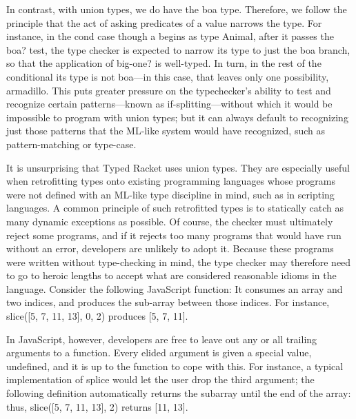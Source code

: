 In contrast, with union types, we do have the boa type. Therefore, we follow the
principle that the act of asking predicates of a value narrows the type. For
instance, in the cond case
though a begins as type Animal, after it passes the boa? test, the type checker
is expected to narrow its type to just the boa branch, so that the application
of big-one? is well-typed. In turn, in the rest of the conditional its type is
not boa—in this case, that leaves only one possibility, armadillo. This puts
greater pressure on the typechecker’s ability to test and recognize certain
patterns—known as if-splitting—without which it would be impossible to program
with union types; but it can always default to recognizing just those patterns
that the ML-like system would have recognized, such as pattern-matching or
type-case.


It is unsurprising that Typed Racket uses union types. They are especially
useful when retrofitting types onto existing programming languages whose
programs were not defined with an ML-like type discipline in mind, such as in
scripting languages. A common principle of such retrofitted types is to
statically catch as many dynamic exceptions as possible. Of course, the checker
must ultimately reject some programs, and if it rejects too many programs that
would have run without an error, developers are unlikely to adopt it. Because
these programs were written without type-checking in mind, the type checker may
therefore need to go to heroic lengths to accept what are considered reasonable
idioms in the language.
Consider the following JavaScript function:
It consumes an array and two indices, and produces the sub-array between those
indices. For instance, slice([5, 7, 11, 13], 0, 2) produces [5, 7, 11].

In JavaScript, however, developers are free to leave out any or all trailing
arguments to a function. Every elided argument is given a special value,
undefined, and it is up to the function to cope with this. For instance, a
typical implementation of splice would let the user drop the third argument; the
following definition
automatically returns the subarray until the end of the array: thus, slice([5,
7, 11, 13], 2) returns [11, 13].

